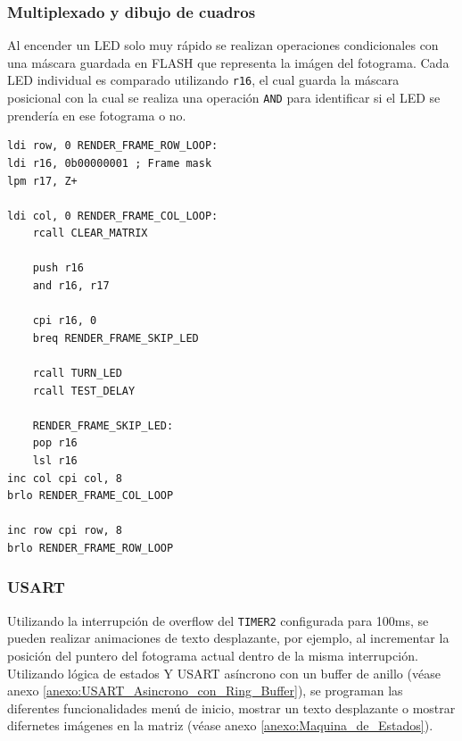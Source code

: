 \subsubsection{Multiplexado y dibujo de cuadros}
Al encender un LED solo muy rápido se realizan operaciones condicionales con una máscara guardada en FLASH que representa la imágen del fotograma. Cada LED individual es comparado utilizando \texttt{r16}, el cual guarda la máscara posicional con la cual se realiza una operación \texttt{AND} para identificar si el LED se prendería en ese fotograma o no. 

\begin{verbatim}
ldi row, 0 RENDER_FRAME_ROW_LOOP:  
ldi r16, 0b00000001 ; Frame mask
lpm r17, Z+

ldi col, 0 RENDER_FRAME_COL_LOOP:
    rcall CLEAR_MATRIX

    push r16
    and r16, r17

    cpi r16, 0 
    breq RENDER_FRAME_SKIP_LED

    rcall TURN_LED
    rcall TEST_DELAY

    RENDER_FRAME_SKIP_LED:
    pop r16
    lsl r16
inc col cpi col, 8 
brlo RENDER_FRAME_COL_LOOP 

inc row cpi row, 8 
brlo RENDER_FRAME_ROW_LOOP
\end{verbatim}

\subsubsection{USART}
Utilizando la interrupción de overflow del \texttt{TIMER2} configurada para 100ms, se pueden realizar animaciones de texto desplazante, por ejemplo, al incrementar la posición del puntero del fotograma actual dentro de la misma interrupción. Utilizando lógica de estados Y USART asíncrono con un buffer de anillo (véase anexo \ref{anexo:USART_Asincrono_con_Ring_Buffer}), se programan las diferentes funcionalidades menú de inicio, mostrar un texto desplazante o mostrar difernetes imágenes en la matriz (véase anexo \ref{anexo:Maquina_de_Estados}).



